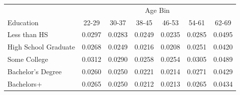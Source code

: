 \begin{tabular}{lcccccc}
\hline\hline
 & \multicolumn{6}{c}{Age Bin} \\
Education & 22-29 & 30-37 & 38-45 & 46-53 & 54-61 & 62-69 \\
\hline
Less than HS&0.0297&0.0283&0.0249&0.0235&0.0285&0.0495\\
High School Graduate&0.0268&0.0249&0.0216&0.0208&0.0251&0.0420\\
Some College&0.0312&0.0290&0.0258&0.0254&0.0305&0.0489\\
Bachelor's Degree&0.0260&0.0250&0.0221&0.0214&0.0271&0.0429\\
Bachelors+&0.0265&0.0250&0.0212&0.0213&0.0265&0.0434\\
\hline\hline
\end{tabular}
